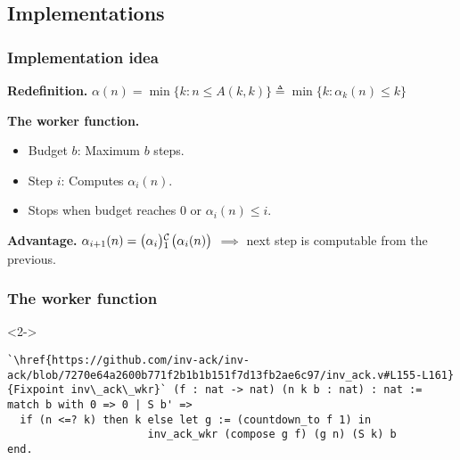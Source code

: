 \subsection{Implementations}
\begin{frame}
\frametitle{Implementation idea}
\textbf{Redefinition.}
$
\alpha(n) = \min\{k: n\le A(k, k) \} \triangleq \min\{k: \alpha_k(n)\le k \}
$

\bigskip

\textbf{The worker function.}
\begin{itemize}
	\item Budget $b$: Maximum $b$ steps.
	\item Step $i$: Computes $\alpha_i(n)$.
	\item Stops when budget reaches $0$ or $\alpha_i(n) \le i$.
\end{itemize}

\bigskip

\textbf{Advantage.} $\alpha_{i+1}(n) = \cdt{\big(\alpha_i\big)}{1}\big(\alpha_i(n)\big)$ $\implies$ next step is computable from the previous.
\end{frame}


\begin{frame}[fragile]
\frametitle{The worker function}


\bigskip

\begin{onlyenv}<2->
	\begin{lstlisting}
`\href{https://github.com/inv-ack/inv-ack/blob/7270e64a2600b771f2b1b1b151f7d13fb2ae6c97/inv_ack.v#L155-L161} {Fixpoint inv\_ack\_wkr}` (f : nat -> nat) (n k b : nat) : nat :=
match b with 0 => 0 | S b' =>
  if (n <=? k) then k else let g := (countdown_to f 1) in
                      inv_ack_wkr (compose g f) (g n) (S k) b
end.
\end{lstlisting}
\end{onlyenv}

\end{frame}



